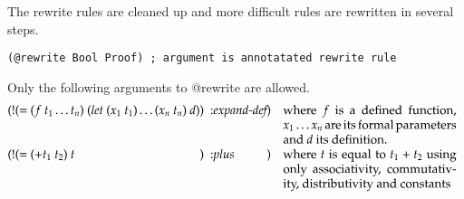 \documentclass[a4paper]{article}
\begin{document}
The rewrite rules are cleaned up and more difficult rules are rewritten
in several steps.

\begin{verbatim}
(@rewrite Bool Proof) ; argument is annotatated rewrite rule
\end{verbatim}

Only the following arguments to @rewrite are allowed.
\[\begin{array}{@{(! (=\ }l@{)\ :}l@{)\quad}p{5cm}}
   (f\ t_1\dots t_n)\ (let\ (x_1\ t_1)\dots(x_n\ t_n)\ d)
   & \textit{expand-def}
   & {where $f$ is a defined function, 
  $x_1\dots x_n$ are its formal parameters and $d$ its definition.}\\
  (+ t_1\ t_2)\ t & plus & {where $t$ is equal to $t_1+t_2$ using only 
  associativity, commutativity, distributivity and constants}\\
\end{array}
\]
\end{document}
